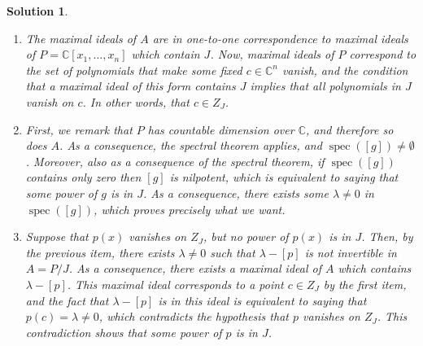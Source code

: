 \documentclass{article}
\theoremstyle{nonumberplain}
\newtheorem{sol}{Solution}
\newcommand{\C}{\mathbb{C}}
\DeclareMathOperator{\spec}{spec}
\begin{document}
\begin{sol}
\leavevmode
\begin{enumerate}[label={(\arabic*)}]
\item The maximal ideals of $A$ are in one-to-one correspondence to maximal ideals of $P = \C[x_1, \dots, x_n]$ which contain $J$. Now, maximal ideals of $P$ correspond to the set of polynomials that make some fixed $c \in \C^n$ vanish, and the condition that a maximal ideal of this form contains $J$ implies that all polynomials in $J$ vanish on $c$. In other words, that $c \in Z_J$.
\addtocounter{enumi}{1}
\item First, we remark that $P$ has countable dimension over $\C$, and therefore so does $A$. As a consequence, the spectral theorem applies, and $\spec([g]) \neq \emptyset$. Moreover, also as a consequence of the spectral theorem, if $\spec([g])$ contains only zero then $[g]$ is nilpotent, which is equivalent to saying that some power of $g$ is in $J$. As a consequence, there exists some $\lambda \neq 0$ in $\spec([g])$, which proves precisely what we want.

\item Suppose that $p(x)$ vanishes on $Z_J$, but no power of $p(x)$ is in $J$. Then, by the previous item, there exists $\lambda \neq 0$ such that $\lambda - [p]$ is not invertible in $A = P/J$. As a consequence, there exists a maximal ideal of $A$ which contains $\lambda - [p]$. This maximal ideal corresponds to a point $c \in Z_J$ by the first item, and the fact that $\lambda - [p]$ is in this ideal is equivalent to saying that $p(c) = \lambda \neq 0$, which contradicts the hypothesis that $p$ vanishes on $Z_J$. This contradiction shows that some power of $p$ is in $J$.
\end{enumerate}
\end{sol}
\end{document}

